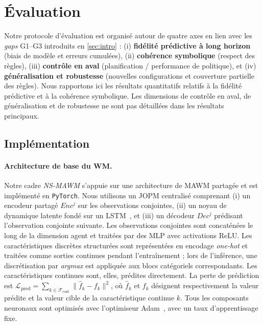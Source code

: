\documentclass[final]{jfsma}
\theoremstyle{plain}
\theoremstyle{definition}
\theoremstyle{remark}
\begin{document}
\section{Évaluation}
\label{sec:eval}

Notre protocole d'évaluation est organisé autour de quatre axes en lien avec les \emph{gaps} G1--G3 introduits en \autoref{sec:intro} :
(i) \textbf{fidélité prédictive à long horizon} (biais de modèle et erreurs cumulées),
(ii) \textbf{cohérence symbolique} (respect des règles),
(iii) \textbf{contrôle en aval} (planification / performance de politique),
et (iv) \textbf{généralisation et robustesse} (nouvelles configurations et couverture partielle des règles).
Nous rapportons ici les résultats quantitatifs relatifs à la fidélité prédictive et à la cohérence symbolique. Les dimensions de contrôle en aval, de généralisation et de robustesse ne sont pas détaillées dans les résultats principaux.

\subsection{Implémentation}
\label{sec:impl_overview}


\paragraph{Architecture de base du WM.}
Notre cadre \textit{NS-MAWM}\hyperref[fn:github]{\footnotemark[1]} s'appuie sur une architecture de MAWM partagée
et est implémenté en \texttt{PyTorch}.
Nous utilisons un JOPM centralisé comprenant
(i) un encodeur partagé $Enc^j$ sur les observations conjointes,
(ii) un noyau de dynamique latente fondé sur un LSTM~\cite{hochreiter1997long},
et (iii) un décodeur $Dec^j$ prédisant l'observation conjointe suivante.
Les observations conjointes sont concaténées le long de la dimension agent et traitées par des MLP avec activations ReLU.
Les caractéristiques discrètes structurées sont représentées en encodage \emph{one-hot} et traitées comme sorties continues pendant l'entraînement ; lors de l'inférence, une discrétisation par \emph{argmax} est appliquée aux blocs catégoriels correspondants. Les caractéristiques continues sont, elles, prédites directement.
La perte de prédiction est
$\mathcal{L}_{\text{pred}} = \sum_{k \in \mathcal{F}_{\text{cont}}}\|\hat{f}_{k} - f_{k}\|^2$,
où $\hat{f}_{k}$ et $f_{k}$ désignent respectivement la valeur prédite et la valeur cible de la caractéristique continue $k$.
Tous les composants neuronaux sont optimisés avec l'optimiseur Adam~\cite{kingma2017adammethodstochasticoptimization},
avec un taux d'apprentissage fixe.
\end{document}
